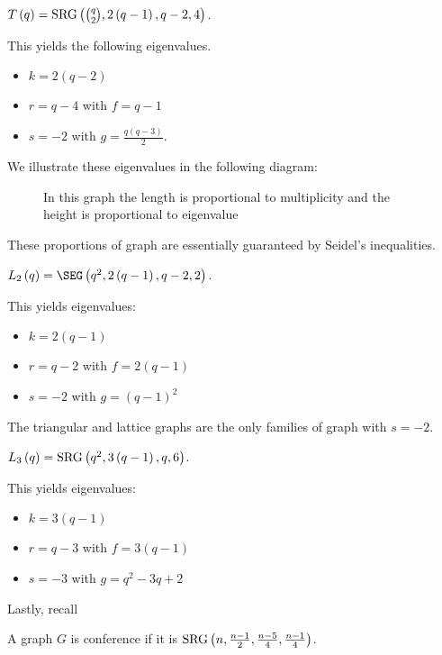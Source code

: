 \begin{recall}
	\(T\left( q \right)  = \operatorname{SRG} \left( \binom{q}{2}, 2\left( q-1 \right), q-2, 4  \right) \).
\end{recall}
This yields the following eigenvalues.
\begin{itemize}
	\item \(k = 2\left( q-2 \right) \)\\
		\item \(r = q-4\) with \(f = q-1\)
		\item \(s = -2\) with \(g = \frac{q\left( q-3 \right) }{2}\).
\end{itemize}
 We illustrate these eigenvalues in the following diagram:
\begin{figure}[ht]
    \centering
    \caption{In this graph the length is proportional to multiplicity and the height is proportional to eigenvalue}
    \label{fig:eigen}
\end{figure}
These proportions of graph are essentially guaranteed by Seidel's inequalities.
\begin{recall}
	\(L_2 \left( q \right)  = \SEG\left( q^2, 2\left( q-1 \right) , q-2, 2 \right) \).
\end{recall}
This yields eigenvalues:
\begin{itemize}
	\item \(k=2\left( q-1 \right) \)
	\item \(r = q-2\) with \(f = 2\left( q-1 \right) \)
	\item \(s = -2\) with \(g = \left( q-1 \right) ^2\)
\end{itemize}
The triangular and lattice graphs are the only families of graph with \(s = -2\).
\begin{recall}
	\(L_3 \left( q \right)  = \operatorname{SRG} \left( q^2, 3\left( q-1 \right) , q, 6 \right) \).
\end{recall}
This yields eigenvalues:
\begin{itemize}
	\item \(k = 3\left( q-1 \right) \)
	\item \( r = q - 3\) with \(f = 3\left( q-1 \right) \)
		\item \(s = -3\) with \(g = q^2 -3q + 2\)
\end{itemize}
Lastly, recall
\begin{recall}
	A graph \(G\) is conference if it is \( \operatorname{SRG} \left( n, \frac{n-1}{2}, \frac{n-5}{4}, \frac{n-1}{4} \right) \).
\end{recall}
